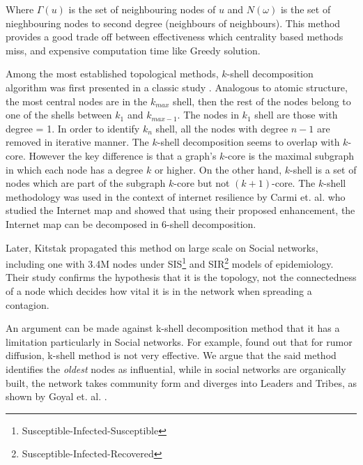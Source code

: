 		Where $\Gamma(u)$ is the set of neighbouring nodes of $u$ and $N(\omega)$ is the set of nieghbouring nodes to second degree (neighbours of neighbours). This method provides a good trade off between effectiveness which centrality based methods miss, and expensive computation time like Greedy solution.
		
		Among the most established topological methods, $k$-shell decomposition algorithm was first presented in a classic study \cite{seidman1983}. Analogous to atomic structure, the most central nodes are in the $k_{max}$ shell, then the rest of the nodes belong to one of the shells between $k_1$ and $k_{max-1}$. The nodes in $k_1$ shell are those with degree = 1. In order to identify $k_n$ shell, all the nodes with degree $n-1$ are removed in iterative manner. The $k$-shell decomposition seems to overlap with $k$-core. However the key difference is that a graph's $k$-core is the maximal subgraph in which each node has a degree $k$ or higher. On the other hand, $k$-shell is a set of nodes which are part of the subgraph $k$-core but not $(k+1)$-core. The $k$-shell methodology was used in the context of internet resilience by Carmi et. al. \cite{carmi2007} who studied the Internet map and showed that using their proposed enhancement, the Internet map can be decomposed in 6-shell decomposition.
		
		Later, Kitstak \cite{kitsak2010} propagated this method on large scale on Social networks, including one with 3.4M nodes under SIS\footnote{Susceptible-Infected-Susceptible} and SIR\footnote{Susceptible-Infected-Recovered} models of epidemiology. Their study confirms the hypothesis that it is the topology, not the connectedness of a node which decides how vital it is in the network when spreading a contagion.
		
		An argument can be made against k-shell decomposition method that it has a limitation particularly in Social networks. For example, \cite{borge2012} found out that for rumor diffusion, k-shell method is not very effective. We argue that the said method identifies the \textit{oldest} nodes as influential, while in social networks are organically built, the network takes community form and diverges into Leaders and Tribes, as shown by Goyal et. al. \cite{goyal2008}.
		

